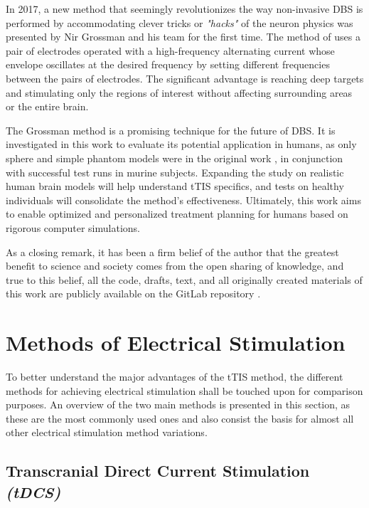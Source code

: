 In 2017, a new method that seemingly revolutionizes the way non-invasive \gls{DBS} is performed by accommodating clever tricks or \textit{"hacks"} of the neuron physics was presented by Nir Grossman and his team \cite{Grossman2017} for the first time. The method of  uses a pair of electrodes operated with a high-frequency alternating current whose envelope oscillates at the desired frequency by setting different frequencies between the pairs of electrodes. The significant advantage is reaching deep targets and stimulating only the regions of interest without affecting surrounding areas or the entire brain.

The Grossman method is a promising technique for the future of \gls{DBS}. It is investigated in this work to evaluate its potential application in humans, as only sphere and simple phantom models were in the original work \cite{Grossman2017}, in conjunction with successful test runs in murine subjects. Expanding the study on realistic human brain models will help understand \gls{tTIS} specifics, and tests on healthy individuals will consolidate the method's effectiveness. Ultimately, this work aims to enable optimized and personalized treatment planning for humans based on rigorous computer simulations. 

As a closing remark, it has been a firm belief of the author that the greatest benefit to science and society comes from the open sharing of knowledge, and true to this belief, all the code, drafts, text, and all originally created materials of this work are publicly available on the GitLab repository \cite{thesis_repo}.

\section{Methods of Electrical Stimulation}

To better understand the major advantages of the \gls{tTIS} method, the different methods for achieving electrical stimulation shall be touched upon for comparison purposes. An overview of the two main methods is presented in this section, as these are the most commonly used ones and also consist the basis for almost all other electrical stimulation method variations.

\subsection{Transcranial Direct Current Stimulation \textit{(tDCS)}}

